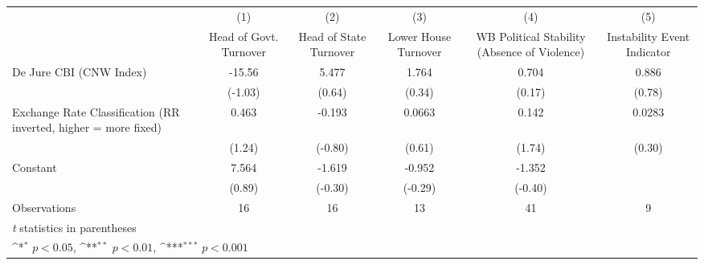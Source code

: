 {
\def\sym#1{\ifmmode^{#1}\else\(^{#1}\)\fi}
\begin{tabular*}{\linewidth}{@{\hskip\tabcolsep\extracolsep\fill}l*{5}{c}}
\toprule
                &\multicolumn{1}{c}{(1)}&\multicolumn{1}{c}{(2)}&\multicolumn{1}{c}{(3)}&\multicolumn{1}{c}{(4)}&\multicolumn{1}{c}{(5)}\\
                &\multicolumn{1}{c}{Head of Govt. Turnover}&\multicolumn{1}{c}{Head of State Turnover}&\multicolumn{1}{c}{Lower House Turnover}&\multicolumn{1}{c}{WB Political Stability (Absence of Violence)}&\multicolumn{1}{c}{Instability Event Indicator}\\
\midrule
De Jure CBI (CNW Index)&   -15.56         &    5.477         &    1.764         &    0.704         &    0.886         \\
                &  (-1.03)         &   (0.64)         &   (0.34)         &   (0.17)         &   (0.78)         \\
\addlinespace
Exchange Rate Classification (RR inverted, higher = more fixed)&    0.463         &   -0.193         &   0.0663         &    0.142         &   0.0283         \\
                &   (1.24)         &  (-0.80)         &   (0.61)         &   (1.74)         &   (0.30)         \\
\addlinespace
Constant        &    7.564         &   -1.619         &   -0.952         &   -1.352         &                  \\
                &   (0.89)         &  (-0.30)         &  (-0.29)         &  (-0.40)         &                  \\
\midrule
Observations    &       16         &       16         &       13         &       41         &        9         \\
\bottomrule
\multicolumn{6}{l}{\footnotesize \textit{t} statistics in parentheses}\\
\multicolumn{6}{l}{\footnotesize \sym{*} \(p<0.05\), \sym{**} \(p<0.01\), \sym{***} \(p<0.001\)}\\
\end{tabular*}
}
